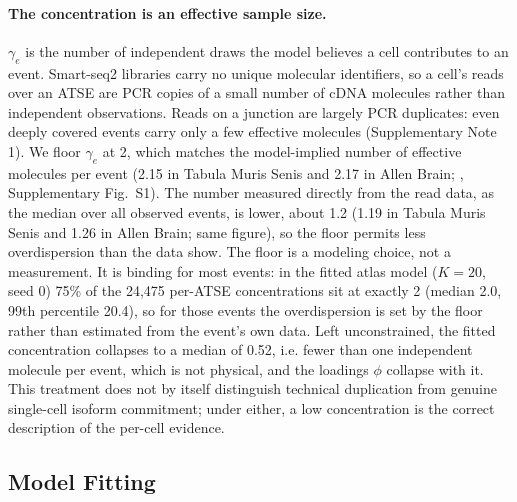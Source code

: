 \paragraph{The concentration is an effective sample size.} $\gamma_e$ is the number of independent draws the model believes a cell contributes to an event. Smart-seq2 libraries carry no unique molecular identifiers, so a cell's reads over an ATSE are PCR copies of a small number of cDNA molecules rather than independent observations. Reads on a junction are largely PCR duplicates: even deeply covered events carry only a few effective molecules (Supplementary Note 1). We floor $\gamma_e$ at 2, which matches the model-implied number of effective molecules per event (2.15 in Tabula Muris Senis and 2.17 in Allen Brain; \cite{SpliceVI2026}, Supplementary Fig.~S1). The number measured directly from the read data, as the median over all observed events, is lower, about 1.2 (1.19 in Tabula Muris Senis and 1.26 in Allen Brain; same figure), so the floor permits less overdispersion than the data show. The floor is a modeling choice, not a measurement. It is binding for most events: in the fitted atlas model ($K = 20$, seed 0) 75\% of the 24{,}475 per-ATSE concentrations sit at exactly 2 (median 2.0, 99th percentile 20.4), so for those events the overdispersion is set by the floor rather than estimated from the event's own data. Left unconstrained, the fitted concentration collapses to a median of 0.52, i.e. fewer than one independent molecule per event, which is not physical, and the loadings $\phi$ collapse with it. This treatment does not by itself distinguish technical duplication from genuine single-cell isoform commitment; under either, a low concentration is the correct description of the per-cell evidence.

\subsection*{Model Fitting}\label{Methods:Minibatch}

